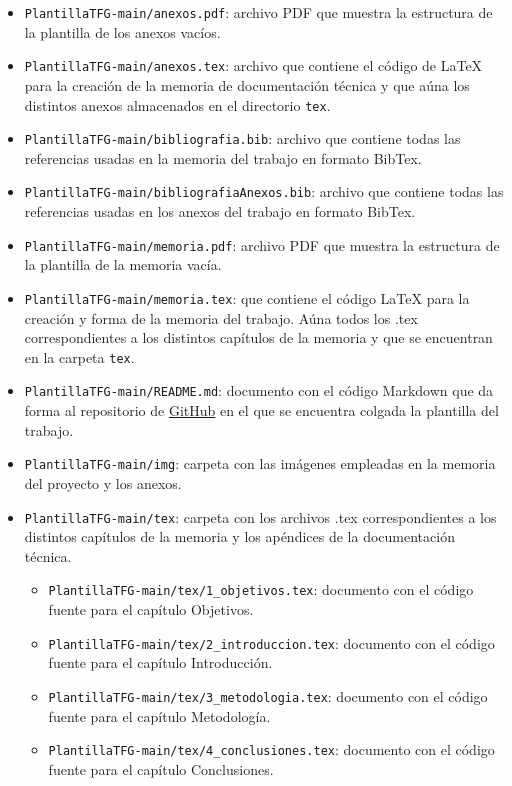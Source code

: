 \begin{itemize}
    \item \texttt{PlantillaTFG-main/anexos.pdf}: archivo PDF que muestra la estructura de la plantilla de los anexos vacíos.
    \item \texttt{PlantillaTFG-main/anexos.tex}: archivo que contiene el código de LaTeX para la creación de la memoria de documentación técnica y que aúna los distintos anexos almacenados en el directorio \texttt{tex}.
    \item \texttt{PlantillaTFG-main/bibliografia.bib}: archivo que contiene todas las referencias usadas en la memoria del trabajo en formato BibTex.
    \item \texttt{PlantillaTFG-main/bibliografiaAnexos.bib}: archivo que contiene todas las referencias usadas en los anexos del trabajo en formato BibTex.
    \item \texttt{PlantillaTFG-main/memoria.pdf}: archivo PDF que muestra la estructura de la plantilla de la memoria vacía.
    \item \texttt{PlantillaTFG-main/memoria.tex}: que contiene el código LaTeX para la creación y forma de la memoria del trabajo. Aúna todos los .tex correspondientes a los distintos capítulos de la memoria y que se encuentran en la carpeta \texttt{tex}.
    \item \texttt{PlantillaTFG-main/README.md}: documento con el código Markdown que da forma al repositorio de \href{https://github.com/IngenieriaSaludBurgos/PlantillaTFG}{GitHub} en el que se encuentra colgada la plantilla del trabajo.
    \item \texttt{PlantillaTFG-main/img}: carpeta con las imágenes empleadas en la memoria del proyecto y los anexos.
    \item \texttt{PlantillaTFG-main/tex}: carpeta con los archivos .tex correspondientes a los distintos capítulos de la memoria y los apéndices de la documentación técnica.
    \begin{itemize}
        \item \texttt{PlantillaTFG-main/tex/1\_objetivos.tex}: documento con el código fuente para el capítulo Objetivos.
        \item \texttt{PlantillaTFG-main/tex/2\_introduccion.tex}: documento con el código fuente para el capítulo Introducción.
        \item \texttt{PlantillaTFG-main/tex/3\_metodologia.tex}: documento con el código fuente para el capítulo Metodología.
        \item \texttt{PlantillaTFG-main/tex/4\_conclusiones.tex}: documento con el código fuente para el capítulo Conclusiones.

\end{itemize}
\end{itemize}
